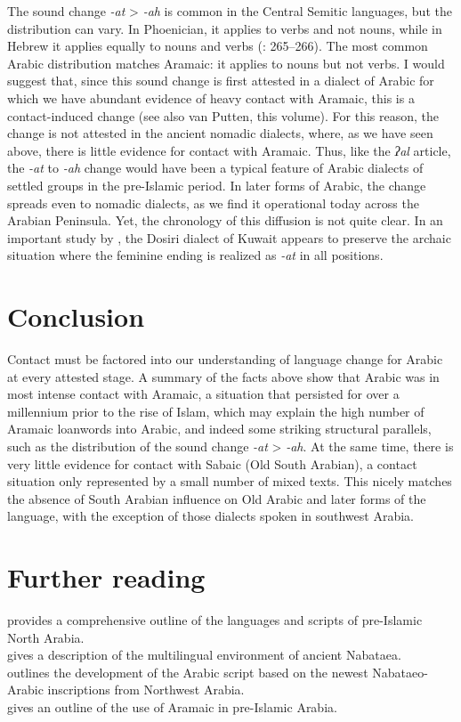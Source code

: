 \documentclass[output=paper]{langsci/langscibook}
\begin{document}
The sound change \textit{-at} > \textit{-ah} is common in the Central Semitic languages, but the distribution can vary. In Phoenician, it applies to verbs and not nouns, while in Hebrew it applies equally to nouns and verbs (\citealt{HuehnergardRubin2011}: 265--266). The most common Arabic distribution matches Aramaic: it applies to nouns but not verbs. I would suggest that, since this sound change is first attested in a dialect of Arabic for which we have abundant evidence of heavy contact with Aramaic, this is a contact-induced change (see also van Putten, this volume). For this reason, the change is not attested in the ancient nomadic dialects, where, as we have seen above, there is little evidence for contact with Aramaic. Thus, like the \textit{ʔal} article, the \textit{-at} to \textit{-ah} change would have been a typical feature of Arabic dialects of settled groups in the pre-Islamic period. In later forms of Arabic, the change spreads even to nomadic dialects, as we find it operational today across the Arabian Peninsula. Yet, the chronology of this diffusion is not quite clear. In an important study by \citet{vanPutten2017}, the Dosiri dialect of Kuwait appears to preserve the archaic situation where the feminine ending is realized as \textit{-at} in all positions.

\section{Conclusion}
Contact must be factored into our understanding of language change for Arabic at every attested stage. A summary of the facts above show that Arabic was in most intense contact with Aramaic, a situation that persisted for over a millennium prior to the rise of Islam, which may explain the high number of Aramaic loanwords into Arabic, and indeed some striking structural parallels, such as the distribution of the sound change \textit{-at} > \textit{-ah}. At the same time, there is very little evidence for contact with Sabaic (Old South Arabian), a contact situation only represented by a small number of mixed texts.  This nicely matches the absence of South Arabian influence on Old Arabic and later forms of the language, with the exception of those dialects spoken in southwest Arabia.

\section*{Further reading}
\citet{Al-Jallad2018ANA} provides a comprehensive outline of the languages and scripts of pre-Islamic North Arabia.\\
\citet{Macdonald2003} gives a description of the multilingual environment of ancient Nabataea. \\
\citet{Nehmé2010} outlines the development of the Arabic script based on the newest Nabataeo-Arabic inscriptions from Northwest Arabia.\\
\citet{Stein2018} gives an outline of the use of Aramaic in pre-Islamic Arabia.
\end{document}
